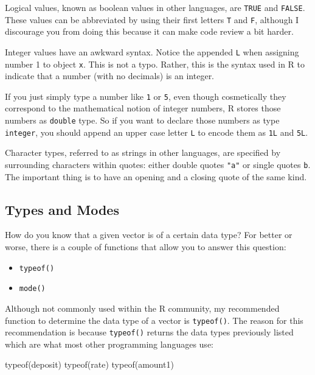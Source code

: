 \documentclass[
]{book}
\newenvironment{Shaded}{\begin{snugshade}}{\end{snugshade}}
\newcommand{\FunctionTok}[1]{\textcolor[rgb]{0.00,0.00,0.00}{#1}}
\newcommand{\NormalTok}[1]{#1}
\begin{document}
Logical values, known as boolean values in other languages, are \texttt{TRUE} and
\texttt{FALSE}. These values can be abbreviated by using their first letters \texttt{T} and
\texttt{F}, although I discourage you from doing this because it can make code review
a bit harder.

Integer values have an awkward syntax. Notice the appended \texttt{L} when assigning
number 1 to object \texttt{x}. This is not a typo. Rather, this is the syntax used in
R to indicate that a number (with no decimals) is an integer.

If you just simply type a number like \texttt{1} or \texttt{5}, even though cosmetically
they correspond to the mathematical notion of integer numbers, R stores those
numbers as \texttt{double} type. So if you want to declare those numbers as type
\texttt{integer}, you should append an upper case letter \texttt{L} to encode them as \texttt{1L}
and \texttt{5L}.

Character types, referred to as strings in other languages, are specified by
surrounding characters within quotes: either double quotes \texttt{"a"} or single
quotes \texttt{\textquotesingle{}b\textquotesingle{}}. The important thing is to have an opening and a closing quote
of the same kind.

\hypertarget{types-and-modes}{%
\subsection{Types and Modes}\label{types-and-modes}}

How do you know that a given vector is of a certain data type? For better or
worse, there is a couple of functions that allow you to answer this question:

\begin{itemize}
\item
  \texttt{typeof()}
\item
  \texttt{mode()}
\end{itemize}

Although not commonly used within the R community, my recommended function
to determine the data type of a vector is \texttt{typeof()}. The reason for this
recommendation is because \texttt{typeof()} returns the data types previously listed
which are what most other programming languages use:

\begin{Shaded}
\begin{Highlighting}[]
\FunctionTok{typeof}\NormalTok{(deposit)}
\FunctionTok{typeof}\NormalTok{(rate)}
\FunctionTok{typeof}\NormalTok{(amount1)}
\end{Highlighting}
\end{Shaded}
\end{document}
